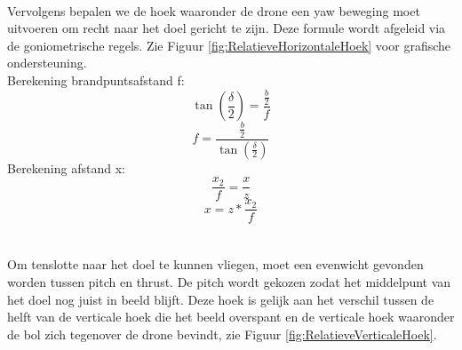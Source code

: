 \\
Vervolgens bepalen we de hoek waaronder de drone een yaw beweging moet uitvoeren om recht naar het doel gericht te zijn. Deze formule wordt afgeleid via de goniometrische regels. Zie Figuur \ref{fig:RelatieveHorizontaleHoek} voor grafische ondersteuning. 
\\
Berekening brandpuntsafstand f:
\begin{equation} \label{eq:RelatieveVerticaleHoekBegin}
\tan(\frac{\delta}{2}) = \frac{\frac{b}{2}}{f}
\end{equation}
\begin{equation} 
f = \frac{\frac{b}{2}}{\tan(\frac{\delta}{2})}
\end{equation}
Berekening afstand x:
\begin{equation} 
\frac{x_2}{f} = \frac{x}{z}
\end{equation}
\begin{equation} \label{eq:RelatieveVerticaleHoekEind}
x = z * \frac{x_2}{f}	
\end{equation}
\\
\\
Om tenslotte naar het doel te kunnen vliegen, moet een evenwicht gevonden worden tussen pitch en thrust. De pitch wordt gekozen zodat het middelpunt van het doel nog juist in beeld blijft. Deze hoek is gelijk aan het verschil tussen de helft van de verticale hoek die het beeld overspant en de verticale hoek waaronder de bol zich tegenover de drone bevindt, zie Figuur \ref{fig:RelatieveVerticaleHoek}. 
\\
